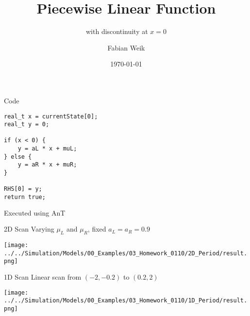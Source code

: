 \documentclass{beamer}
\title{Piecewise Linear Function}
\subtitle{with discontinuity at $x = 0$}
\author{Fabian Weik}
\institute{Overleaf}
\date{\today}
\begin{document}
\frame{\titlepage}

\begin{frame}[fragile]{Code}
    \begin{lstlisting}
real_t x = currentState[0];
real_t y = 0;

if (x < 0) {
    y = aL * x + muL;
} else {
    y = aR * x + muR;
}

RHS[0] = y;
return true;
    \end{lstlisting}
    
    Executed using AnT
    
\end{frame}

\begin{frame}{2D Scan}
    Varying $\mu_L$ and $\mu_R$, fixed $a_L = a_R = 0.9$
    
    \centering
    \vspace*{1em}
    \texttt{[image: ../../Simulation/Models/00\_Examples/03\_Homework\_0110/2D\_Period/result.png]}
\end{frame}

\begin{frame}{1D Scan}
    Linear scan from $(-2, -0.2)$ to $(0.2, 2)$

    \centering
    \vspace*{1em}
    \texttt{[image: ../../Simulation/Models/00\_Examples/03\_Homework\_0110/1D\_Period/result.png]}
\end{frame}
\end{document}
